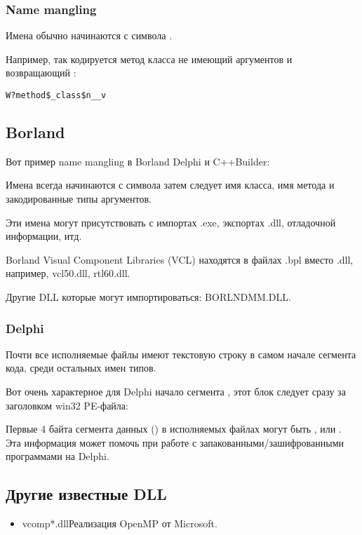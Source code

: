 \subsubsection{Name mangling}

Имена обычно начинаются с символа .

Например, так кодируется метод  класса  не имеющий аргументов и возвращающий \Tvoid{}:

\begin{lstlisting}
W?method$_class$n__v
\end{lstlisting}

\subsection{Borland}

Вот пример \gls{name mangling} в Borland Delphi и C++Builder:



Имена всегда начинаются с символа  
затем следует имя класса, имя метода
и закодированные типы аргументов.

Эти имена могут присутствовать с импортах .exe, экспортах .dll, отладочной информации, итд.

Borland Visual Component Libraries (VCL) находятся в файлах .bpl вместо .dll, например, vcl50.dll, rtl60.dll.

Другие DLL которые могут импортироваться: BORLNDMM.DLL.

\subsubsection{Delphi}

Почти все исполняемые файлы имеют текстовую строку  
в самом начале сегмента кода, среди остальных имен типов.

Вот очень характерное для Delphi начало сегмента , 
этот блок следует сразу за заголовком win32 PE-файла:



Первые 4 байта сегмента данных () в исполняемых файлах могут быть ,  или .
Эта информация может помочь при работе с запакованными/зашифрованными программами на Delphi.

\subsection{Другие известные DLL}

\begin{itemize}
\item vcomp*.dll\EMDASH{}Реализация OpenMP от Microsoft.
\end{itemize}

